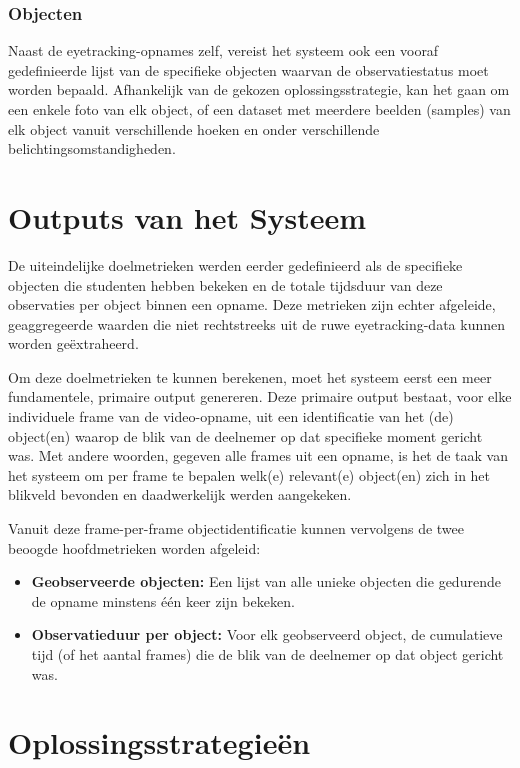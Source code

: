 \subsubsection{Objecten}

Naast de eyetracking-opnames zelf, vereist het systeem ook een vooraf gedefinieerde lijst van de specifieke objecten waarvan de observatiestatus moet worden bepaald.
Afhankelijk van de gekozen oplossingsstrategie, kan het gaan om een enkele foto van elk object, of een dataset met meerdere beelden (samples) van elk object vanuit verschillende hoeken en onder verschillende belichtingsomstandigheden.

\section{Outputs van het Systeem}

De uiteindelijke doelmetrieken werden eerder gedefinieerd als de specifieke objecten die studenten hebben bekeken en de totale 
tijdsduur van deze observaties per object binnen een opname. 
Deze metrieken zijn echter afgeleide, geaggregeerde waarden die niet rechtstreeks 
uit de ruwe eyetracking-data kunnen worden geëxtraheerd.

Om deze doelmetrieken te kunnen berekenen, moet het systeem eerst een meer fundamentele, primaire output genereren. 
Deze primaire output bestaat, voor elke individuele frame van de video-opname, uit een identificatie van het (de) object(en) 
waarop de blik van de deelnemer op dat specifieke moment gericht was. Met andere woorden, gegeven alle frames uit een opname, 
is het de taak van het systeem om per frame te bepalen welk(e) relevant(e) object(en) zich in het blikveld bevonden en daadwerkelijk werden aangekeken.

Vanuit deze frame-per-frame objectidentificatie kunnen vervolgens de twee beoogde hoofdmetrieken worden afgeleid:
\begin{itemize}
    \item \textbf{Geobserveerde objecten:} Een lijst van alle unieke objecten die gedurende de opname minstens één keer zijn bekeken.
    \item \textbf{Observatieduur per object:} Voor elk geobserveerd object, de cumulatieve tijd (of het aantal frames) die de blik van de deelnemer op dat object gericht was.
\end{itemize}

\section{Oplossingsstrategieën}


